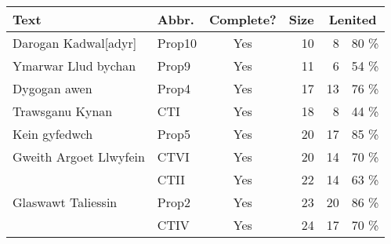 \begin{table}[h]
\centering
\begin{tabular}{@{}llcrrr@{}}
\toprule
\textbf{Text}                     & \textbf{Abbr.} & \multicolumn{1}{l}{\textbf{Complete?}} & \multicolumn{1}{l}{\textbf{Size}} & \multicolumn{2}{c}{\textbf{Lenited}} \\ \midrule
Darogan Kadwal{[}adyr{]}          & Prop10         & Yes                                      & 10                                       & 8                                    & 80                                   \% \\
Ymarwar Llud bychan               & Prop9          & Yes                                      & 11                                       & 6                                    & 54                                   \% \\
Dygogan awen                      & Prop4          & Yes                                      & 17                                       & 13                                   & 76                                   \% \\
Trawsganu Kynan                   & CTI            & Yes                                      & 18                                       & 8                                    & 44                                   \% \\
Kein gyfedwch                     & Prop5          & Yes                                      & 20                                       & 17                                   & 85                                   \% \\
Gweith Argoet Llwyfein            & CTVI           & Yes                                      & 20                                       & 14                                   & 70                                   \% \\
                                  & CTII           & Yes                                      & 22                                       & 14                                   & 63                                   \% \\
Glaswawt Taliessin                & Prop2          & Yes                                      & 23                                       & 20                                   & 86                                   \% \\
                                  & CTIV           & Yes                                      & 24                                       & 17                                   & 70                                   \% \\

\end{tabular}
\end{table}
